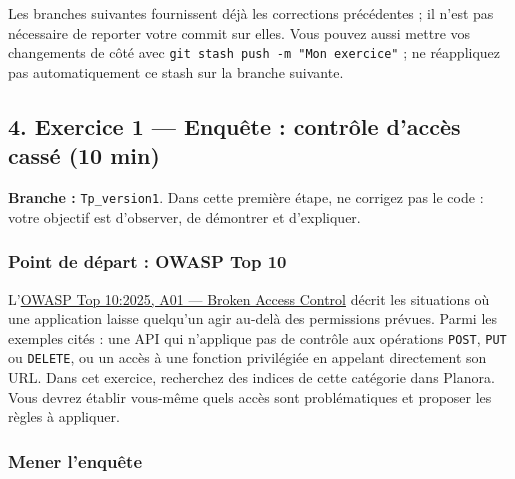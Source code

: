 \documentclass[
  french,
  10pt,
  a4paper,
]{article}
\begin{document}
Les branches suivantes fournissent déjà les corrections précédentes ; il
n'est pas nécessaire de reporter votre commit sur elles. Vous pouvez
aussi mettre vos changements de côté avec
\texttt{git\ stash\ push\ -m\ "Mon\ exercice"} ; ne réappliquez pas
automatiquement ce stash sur la branche suivante.

\subsection{4. Exercice 1 --- Enquête : contrôle d'accès cassé (10
min)}\label{exercice-1-enquuxeate-contruxf4le-daccuxe8s-cassuxe9-10-min}

\textbf{Branche :} \texttt{Tp\_version1}. Dans cette première étape, ne
corrigez pas le code : votre objectif est d'observer, de démontrer et
d'expliquer.

\subsubsection{Point de départ : OWASP Top
10}\label{point-de-duxe9part-owasp-top-10}

L'\href{https://top10.owasp.org/2025/A01_2025-Broken_Access_Control/}{OWASP
Top 10:2025, A01 --- Broken Access Control} décrit les situations où une
application laisse quelqu'un agir au-delà des permissions prévues. Parmi
les exemples cités : une API qui n'applique pas de contrôle aux
opérations \texttt{POST}, \texttt{PUT} ou \texttt{DELETE}, ou un accès à
une fonction privilégiée en appelant directement son URL. Dans cet
exercice, recherchez des indices de cette catégorie dans Planora. Vous
devrez établir vous-même quels accès sont problématiques et proposer les
règles à appliquer.

\subsubsection{Mener l'enquête}\label{mener-lenquuxeate}
\end{document}
